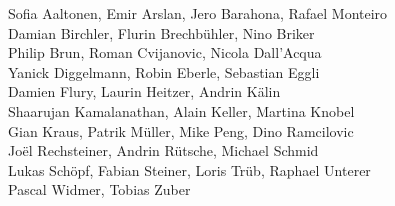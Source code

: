 %
%
%
Sofia Aaltonen,		%
Emir Arslan, 		%
Jero Barahona,		%
Rafael Monteiro%
\\
Damian Birchler,	%
Flurin Brechbühler,	%
Nino Briker%
\\
Philip Brun,		%
Roman Cvijanovic,	%
Nicola Dall'Acqua%
\\
Yanick Diggelmann,	%
Robin Eberle,		%
Sebastian Eggli%
\\
Damien Flury,		%
Laurin Heitzer,		%
Andrin Kälin%
\\
Shaarujan Kamalanathan,	%
Alain Keller,		%
Martina Knobel%
\\
Gian Kraus,		%
Patrik Müller,		%
Mike Peng,		%
Dino Ramcilovic%
\\
Joël Rechsteiner,	%
Andrin Rütsche,		%
Michael Schmid%
\\
Lukas Schöpf,		%
Fabian Steiner,		%
Loris Trüb,		%
Raphael Unterer%
\\
Pascal Widmer,		%
Tobias Zuber%
\\
